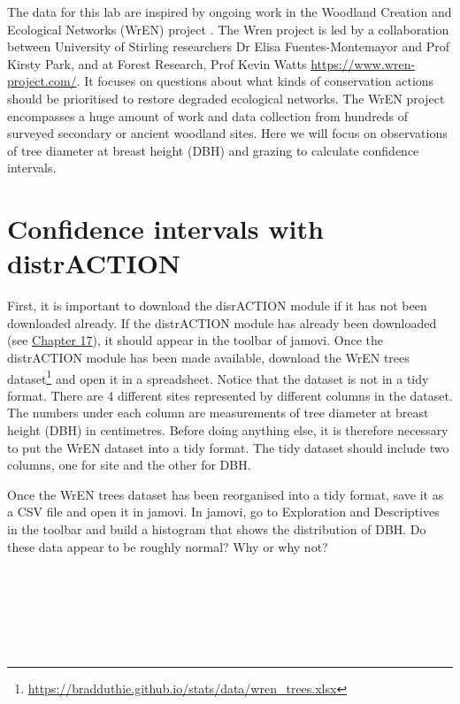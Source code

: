 \documentclass[
  openany]{scrbook}
\begin{document}
The data for this lab are inspired by ongoing work in the Woodland Creation and Ecological Networks (WrEN) project \citep{Fuentes-Montemayor2022, Fuentes-Montemayor2022a}.
The Wren project is led by a collaboration between University of Stirling researchers Dr Elisa Fuentes-Montemayor and Prof Kirsty Park, and at Forest Research, Prof Kevin Watts \url{https://www.wren-project.com/}.
It focuses on questions about what kinds of conservation actions should be prioritised to restore degraded ecological networks.
The WrEN project encompasses a huge amount of work and data collection from hundreds of surveyed secondary or ancient woodland sites.
Here we will focus on observations of tree diameter at breast height (DBH) and grazing to calculate confidence intervals.

\hypertarget{confidence-intervals-with-distraction}{%
\section{Confidence intervals with distrACTION}\label{confidence-intervals-with-distraction}}

First, it is important to download the disrACTION module if it has not been downloaded already.
If the distrACTION module has already been downloaded (see \protect\hyperlink{Chapter_17}{Chapter 17}), it should appear in the toolbar of jamovi.
Once the distrACTION module has been made available, download the WrEN trees dataset\footnote{\url{https://bradduthie.github.io/stats/data/wren_trees.xlsx}} and open it in a spreadsheet.
Notice that the dataset is not in a tidy format.
There are 4 different sites represented by different columns in the dataset.
The numbers under each column are measurements of tree diameter at breast height (DBH) in centimetres.
Before doing anything else, it is therefore necessary to put the WrEN dataset into a tidy format.
The tidy dataset should include two columns, one for site and the other for DBH.

Once the WrEN trees dataset has been reorganised into a tidy format, save it as a CSV file and open it in jamovi.
In jamovi, go to Exploration and Descriptives in the toolbar and build a histogram that shows the distribution of DBH.
Do these data appear to be roughly normal?
Why or why not?

\begin{verbatim}






\end{verbatim}
\end{document}
